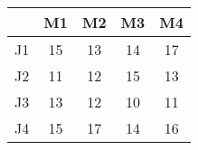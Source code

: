 \begin{center}
\begin{tabular}{|c|c|c|c|c|}
\hline
 & M1 & M2 & M3 & M4 \\ \hline
J1 & 15 & 13 & 14 & 17 \\ \hline
J2 & 11 & 12 & 15 & 13 \\ \hline
J3 & 13 & 12 & 10 & 11 \\ \hline
J4 & 15 & 17 & 14 & 16 \\ \hline
\end{tabular}
\end{center}